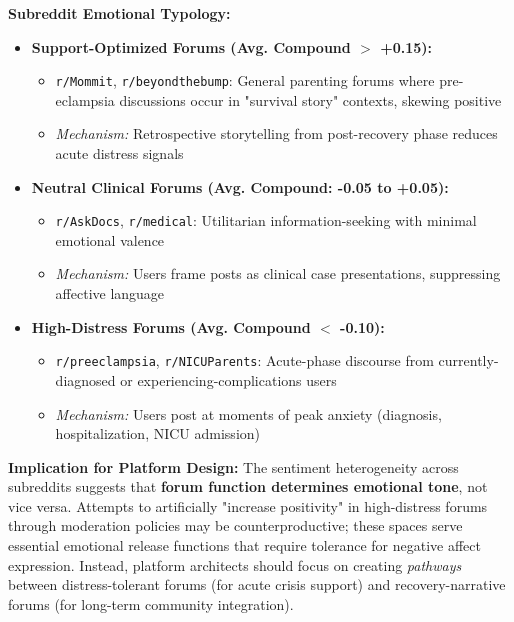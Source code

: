 \documentclass[12pt, a4paper]{article}
\begin{document}
\textbf{Subreddit Emotional Typology:}
\begin{itemize}
    \item \textbf{Support-Optimized Forums (Avg. Compound $>$ +0.15):}
    \begin{itemize}
        \item \texttt{r/Mommit}, \texttt{r/beyondthebump}: General parenting forums where pre-eclampsia discussions occur in "survival story" contexts, skewing positive
        \item \textit{Mechanism:} Retrospective storytelling from post-recovery phase reduces acute distress signals
    \end{itemize}
    
    \item \textbf{Neutral Clinical Forums (Avg. Compound: -0.05 to +0.05):}
    \begin{itemize}
        \item \texttt{r/AskDocs}, \texttt{r/medical}: Utilitarian information-seeking with minimal emotional valence
        \item \textit{Mechanism:} Users frame posts as clinical case presentations, suppressing affective language
    \end{itemize}
    
    \item \textbf{High-Distress Forums (Avg. Compound $<$ -0.10):}
    \begin{itemize}
        \item \texttt{r/preeclampsia}, \texttt{r/NICUParents}: Acute-phase discourse from currently-diagnosed or experiencing-complications users
        \item \textit{Mechanism:} Users post at moments of peak anxiety (diagnosis, hospitalization, NICU admission)
    \end{itemize}
\end{itemize}

\textbf{Implication for Platform Design:} The sentiment heterogeneity across subreddits suggests that \textbf{forum function determines emotional tone}, not vice versa. Attempts to artificially "increase positivity" in high-distress forums through moderation policies may be counterproductive; these spaces serve essential emotional release functions that require tolerance for negative affect expression. Instead, platform architects should focus on creating \textit{pathways} between distress-tolerant forums (for acute crisis support) and recovery-narrative forums (for long-term community integration).
\end{document}
